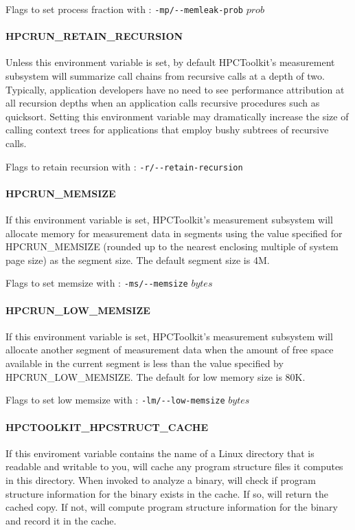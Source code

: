 \parg
Flags to set process fraction with \hpcrun: \verb|-mp/--memleak-prob| $prob$


\paragraph{HPCRUN\_RETAIN\_RECURSION}

Unless this environment variable is set, by default HPCToolkit's
measurement subsystem will summarize call chains from recursive calls
at a depth of two. Typically, application developers have no need
to see performance attribution at all recursion depths when an
application calls recursive procedures such as quicksort. Setting
this environment variable may dramatically increase the size of
calling context trees for applications that employ bushy subtrees
of recursive calls.

\parg
Flags to retain recursion with \hpcrun: \verb|-r/--retain-recursion|

\paragraph{HPCRUN\_MEMSIZE}

If this environment variable is set, HPCToolkit's measurement subsystem
will allocate memory for measurement data in segments using the
value specified for HPCRUN\_MEMSIZE (rounded up to the nearest
enclosing multiple of system page size) as the segment size. The
default segment size is 4M.

\parg
Flags to set memsize with \hpcrun: \verb|-ms/--memsize| $bytes$

\paragraph{HPCRUN\_LOW\_MEMSIZE}

If this environment variable is set, HPCToolkit's measurement subsystem
will allocate another segment of measurement data when the amount
of free space available in the current segment is less than the
value specified by HPCRUN\_LOW\_MEMSIZE. The default for low memory
size is 80K.

\parg
Flags to set low memsize with \hpcrun: \verb|-lm/--low-memsize| $bytes$


\paragraph{HPCTOOLKIT\_HPCSTRUCT\_CACHE}

If this enviroment variable contains the name of a Linux directory
that is readable and writable to you, \hpcstruct{} will cache any
program structure files it computes in this directory. When invoked
to analyze a binary, \hpcstruct{} will check if program structure
information for the binary exists in the cache. If so, \hpcstruct{}
will return the cached copy.  If not, \hpcstruct{} will compute
program structure information for the binary and record it in the
cache.

